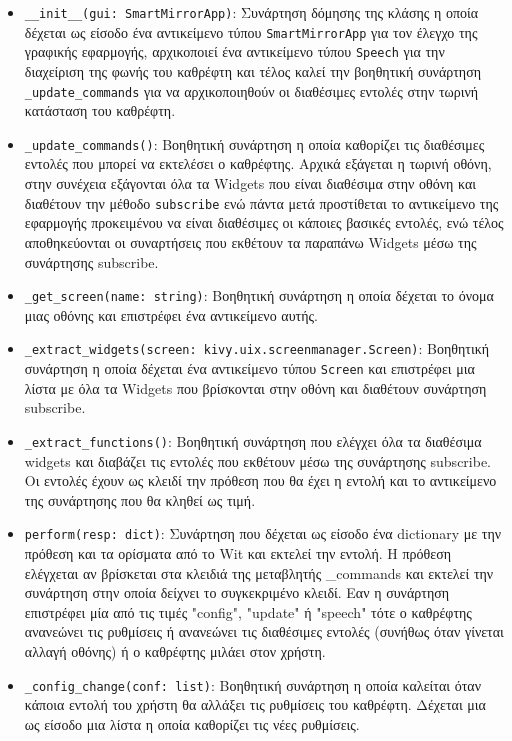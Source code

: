 \begin{itemize}
    \item \texttt{\_\_init\_\_(gui: SmartMirrorApp)}: Συνάρτηση δόμησης της κλάσης η οποία δέχεται ως είσοδο ένα αντικείμενο τύπου \texttt{SmartMirrorApp} για τον έλεγχο της γραφικής εφαρμογής, αρχικοποιεί ένα αντικείμενο τύπου \texttt{Speech} για την διαχείριση της φωνής του καθρέφτη και τέλος καλεί την βοηθητική συνάρτηση \texttt{\_update\_commands} για να αρχικοποιηθούν οι διαθέσιμες εντολές στην τωρινή κατάσταση του καθρέφτη.
    \item \texttt{\_update\_commands()}: Βοηθητική συνάρτηση η οποία καθορίζει τις διαθέσιμες εντολές που μπορεί να εκτελέσει ο καθρέφτης. Αρχικά εξάγεται η τωρινή οθόνη, στην συνέχεια εξάγονται όλα τα Widgets που είναι διαθέσιμα στην οθόνη και διαθέτουν την μέθοδο \texttt{subscribe} ενώ πάντα μετά προστίθεται το αντικείμενο της εφαρμογής προκειμένου να είναι διαθέσιμες οι κάποιες βασικές εντολές, ενώ τέλος αποθηκεύονται οι συναρτήσεις που εκθέτουν τα παραπάνω Widgets μέσω της συνάρτησης subscribe.
    \item \texttt{\_get\_screen(name: string)}: Βοηθητική συνάρτηση η οποία δέχεται το όνομα μιας οθόνης και επιστρέφει ένα αντικείμενο αυτής.
    \item \texttt{\_extract\_widgets(screen: kivy.uix.screenmanager.Screen)}: Βοηθητική συνάρτηση η οποία δέχεται ένα αντικείμενο τύπου \texttt{Screen} και επιστρέφει μια λίστα με όλα τα Widgets που βρίσκονται στην οθόνη και διαθέτουν συνάρτηση subscribe.
    \item \texttt{\_extract\_functions()}: Βοηθητική συνάρτηση που ελέγχει όλα τα διαθέσιμα widgets και διαβάζει τις εντολές που εκθέτουν μέσω της συνάρτησης subscribe. Οι εντολές έχουν ως κλειδί την πρόθεση που θα έχει η εντολή και το αντικείμενο της συνάρτησης που θα κληθεί ως τιμή.
    \item \texttt{perform(resp: dict)}: Συνάρτηση που δέχεται ως είσοδο ένα dictionary με την πρόθεση και τα ορίσματα από το Wit και εκτελεί την εντολή. Η πρόθεση ελέγχεται αν βρίσκεται στα κλειδιά της μεταβλητής \_commands και εκτελεί την συνάρτηση στην οποία δείχνει το συγκεκριμένο κλειδί. Εαν η συνάρτηση επιστρέφει μία από τις τιμές "config", "update" ή "speech" τότε ο καθρέφτης ανανεώνει τις ρυθμίσεις ή ανανεώνει τις διαθέσιμες εντολές (συνήθως όταν γίνεται αλλαγή οθόνης) ή ο καθρέφτης μιλάει στον χρήστη.
    \item \texttt{\_config\_change(conf: list)}: Βοηθητική συνάρτηση η οποία καλείται όταν κάποια εντολή του χρήστη θα αλλάξει τις ρυθμίσεις του καθρέφτη. Δέχεται μια ως είσοδο μια λίστα η οποία καθορίζει τις νέες ρυθμίσεις.
\end{itemize}

